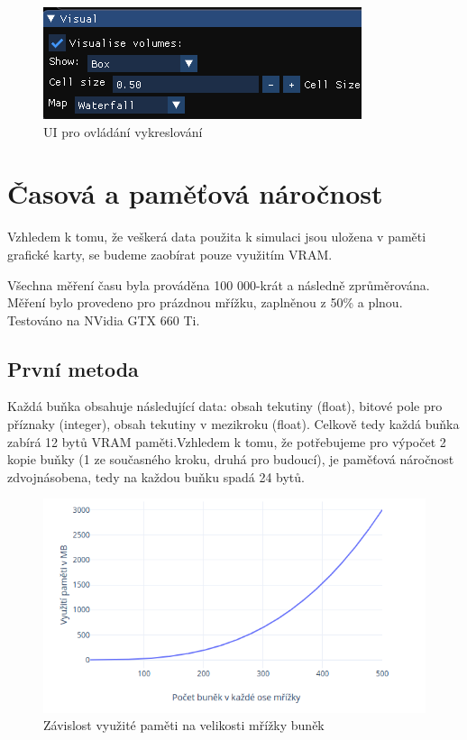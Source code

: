 \documentclass[12pt,a4paper,titlepage,final]{report}
\begin{document}
\begin{figure}[H]
    \centering
    \includegraphics[scale=2.3]{images/visual.png}
    \caption{UI pro ovládání vykreslování}
    \label{fig:simui}
\end{figure}


\section{Časová a paměťová náročnost}
Vzhledem k tomu, že veškerá data použita k simulaci jsou uložena v paměti grafické karty, se budeme zaobírat pouze využitím VRAM. 

Všechna měření času byla prováděna 100 000-krát a následně zprůměrována. Měření bylo provedeno pro prázdnou mřížku, zaplněnou z 50\% a plnou. Testováno na NVidia GTX 660 Ti.

\subsection{První metoda}
Každá buňka obsahuje následující data: obsah tekutiny (float), bitové pole pro příznaky (integer), obsah tekutiny v mezikroku (float). Celkově tedy každá buňka zabírá 12 bytů VRAM paměti.Vzhledem k tomu, že potřebujeme pro výpočet 2 kopie buňky (1 ze současného kroku, druhá pro budoucí), je paměťová náročnost zdvojnásobena, tedy na každou buňku spadá 24 bytů.

\begin{figure}[H]
    \centering
    \includegraphics[scale=2]{images/memory.png}
    \caption{Závislost využité paměti na velikosti mřížky buněk}
    \label{fig:mem}
\end{figure}
\end{document}
